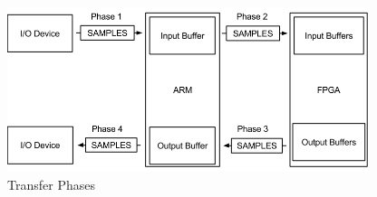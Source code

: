 \begin{figure}[H]
	\centerline{
	\includegraphics[width=400px]{figures/sw/transfer-phases.png}}
	\caption{Transfer Phases}
	\label{fig:sw_transfer_phases}
\end{figure}
\FloatBarrier
